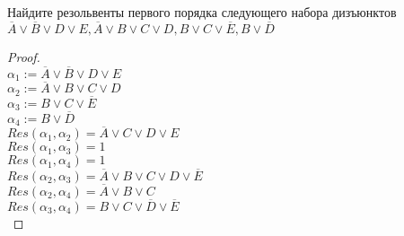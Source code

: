 
\renewcommand*{\proofname}{Решение}
\newcommand*\circled[1]{\tikz[baseline=(char.base)]{\node[shape=circle,draw,inner sep=2pt] (char) {#1};}}
\newcommand*\ccircled[1]{\tikz[baseline=(char.base)]
{\node[shape=circle,draw=black, fill=gray, opacity=0.8,inner sep=2pt] (char) {#1};}}
\newcommand*\bicircled[1]{\tikz[baseline=(char.base)]{\node[shape=circle,draw,inner sep=1pt] (char) {#1};}}




\begin{problem}
Найдите резольвенты первого порядка следующего набора дизъюнктов $\overline{A} \vee \overline{B} \vee D \vee E, \overline{A} \vee B \vee C \vee D, B \vee C \vee \overline{E}, B \vee \overline{D}$
\end{problem}
\begin{proof} $ $\\
    $\alpha_1 := \overline{A} \vee \overline{B} \vee D \vee E$\\
    $\alpha_2 := \overline{A} \vee B \vee C \vee D$\\
    $\alpha_3 :=  B \vee C \vee \overline{E}$\\
    $\alpha_4 := B \vee \overline{D}$\\
    $Res(\alpha_1, \alpha_2) = \overline{A} \vee C \vee D \vee E$\\
    $Res(\alpha_1, \alpha_3) = 1$\\
    $Res(\alpha_1, \alpha_4) = 1$\\
    $Res(\alpha_2, \alpha_3) = \overline{A} \vee B \vee C \vee D \vee \overline{E}$\\
    $Res(\alpha_2, \alpha_4) = \overline{A} \vee B \vee C$\\
    $Res(\alpha_3, \alpha_4) = B \vee C \vee \overline{D} \vee \overline{E}$\\
\end{proof}


